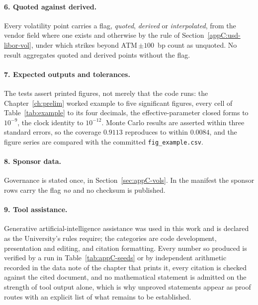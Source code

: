 \documentclass[../../main.tex]{subfiles}
\begin{document}
\paragraph{6. Quoted against derived.} Every volatility point carries a flag, \emph{quoted}, \emph{derived} or \emph{interpolated}, from the vendor field where one exists and otherwise by the rule of Section~\ref{appC:usd-libor-vol}, under which strikes beyond ATM\,$\pm100$~bp count as unquoted. No result aggregates quoted and derived points without the flag.

\paragraph{7. Expected outputs and tolerances.} The tests assert printed figures, not merely that the code runs: the Chapter~\ref{ch:prelim} worked example to five significant figures, every cell of Table~\ref{tab:example} to its four decimals, the effective-parameter closed forms to $10^{-9}$, the clock identity to $10^{-12}$. Monte Carlo results are asserted within three standard errors, so the coverage $0.9113$ reproduces to within $0.0084$, and the figure series are compared with the committed \texttt{fig\_example.csv}.

\paragraph{8. Sponsor data.} Governance is stated once, in Section~\ref{sec:appC-vols}. In the manifest the sponsor rows carry the flag \emph{no} and no checksum is published.

\paragraph{9. Tool assistance.} Generative artificial-intelligence assistance was used in this work and is declared as the University's rules require; the categories are code development, presentation and editing, and citation formatting. Every number so produced is verified by a run in Table~\ref{tab:appC-seeds} or by independent arithmetic recorded in the data note of the chapter that prints it, every citation is checked against the cited document, and no mathematical statement is admitted on the strength of tool output alone, which is why unproved statements appear as proof routes with an explicit list of what remains to be established.

\end{document}
